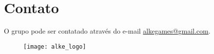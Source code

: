 \AddToShipoutPicture{\BackgroundPic}

\section*{Contato}
O grupo pode ser contatado através do e-mail \href{mailto:alkegames@gmail.com}{alkegames@gmail.com}.
	
	\begin{figure}[htb]
		\vspace{4cm}
		\center
		\texttt{[image: alke\_logo]}
	\end{figure}
